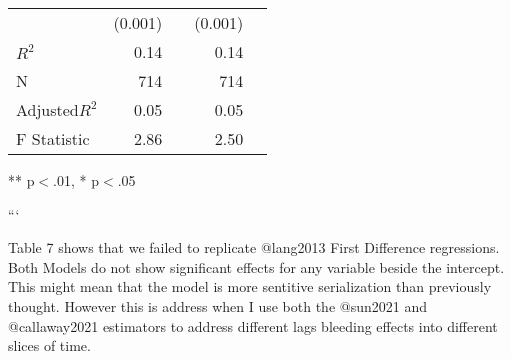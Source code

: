 \begin{table}[!h]
\begin{tabular}{lllll}
\multicolumn{1}{l}{} &
  \multicolumn{1}{r}{(0.001)} &
  \multicolumn{1}{l}{} &
  \multicolumn{1}{r}{(0.001)} &
  \multicolumn{1}{l}{} \\
\multicolumn{1}{l}{$R^{2}$} &
  \multicolumn{1}{r}{0.14} &
  \multicolumn{1}{l}{} &
  \multicolumn{1}{r}{0.14} &
  \multicolumn{1}{l}{} \\
\multicolumn{1}{l}{N} &
  \multicolumn{1}{r}{714} &
  \multicolumn{1}{l}{} &
  \multicolumn{1}{r}{714} &
  \multicolumn{1}{l}{} \\
\multicolumn{1}{l}{Adjusted$R^{2}$} &
  \multicolumn{1}{r}{0.05} &
  \multicolumn{1}{l}{} &
  \multicolumn{1}{r}{0.05} &
  \multicolumn{1}{l}{} \\
\multicolumn{1}{l}{F Statistic} &
  \multicolumn{1}{r}{2.86} &
  \multicolumn{1}{l}{} &
  \multicolumn{1}{r}{2.50} &
  \multicolumn{1}{l}{} \\
\cline{1-5}
\end{tabular}

\footnotesize{
** p$<$.01, * p$<$.05
}
\end{table}
```

Table 7 shows that we failed to replicate @lang2013 First Difference regressions. Both Models do not show significant effects for any variable beside the intercept. This might mean that the model is more sentitive serialization than previously thought. However this is address when I use both the @sun2021 and @callaway2021 estimators to address different lags bleeding effects into different slices of time.
